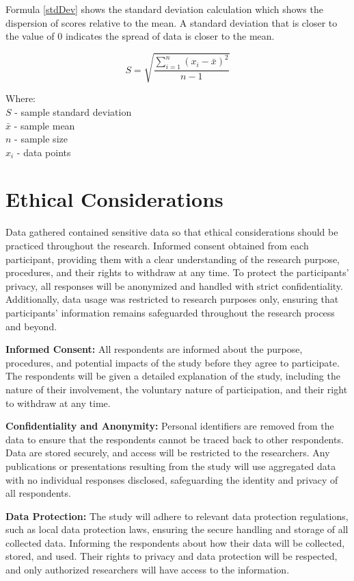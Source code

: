 	Formula \ref{stdDev} shows the standard deviation calculation which shows the dispersion of scores relative to the mean. A standard deviation  that is closer to the value of 0 indicates the spread of data is closer to the mean.
	
	\begin{equation} 
		\label{stdDev}
		S = \sqrt{\frac{\sum_{i=1}^{n} (x_{i} - \bar{x} )^2 }{n-1}}
	\end{equation}
	
	\noindent Where:
	\\$S$ - sample standard deviation
	\\$\bar{x}$ - sample mean
	\\$n$ - sample size
	\\$x_{i}$ - data points
	

\section{Ethical Considerations}
	Data gathered contained sensitive data so that ethical considerations should be practiced throughout the research.  Informed consent obtained from each participant, providing them with a clear understanding of the research purpose, procedures, and their rights to withdraw at any time. To protect the participants’ privacy, all responses will be anonymized and handled with strict confidentiality. Additionally, data usage was restricted to research purposes only, ensuring that participants' information remains safeguarded throughout the research process and beyond. 
	
	\textbf{Informed Consent:} All respondents are informed about the purpose, procedures, and potential impacts of the study before they agree to participate. The respondents will be given a detailed explanation of the study, including the nature of their involvement, the voluntary nature of participation, and their right to withdraw at any time.
	
	\textbf{Confidentiality and Anonymity:} Personal identifiers are removed from the data to ensure that the respondents cannot be traced back to other respondents. Data are stored securely, and access will be restricted to the researchers. Any publications or presentations resulting from the study will use aggregated data with no individual responses disclosed, safeguarding the identity and privacy of all respondents.
	
	\textbf{Data Protection:} The study will adhere to relevant data protection regulations, such as local data protection laws, ensuring the secure handling and storage of all collected data. Informing the respondents about how their data will be collected, stored, and used. Their rights to privacy and data protection will be respected, and only authorized researchers will have access to the information.
	

